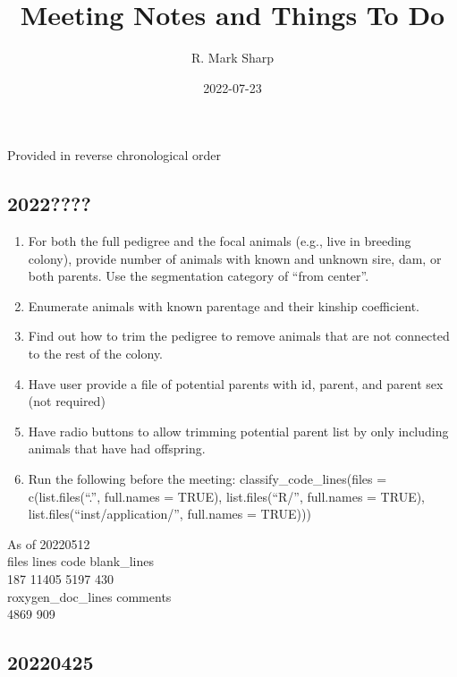 \documentclass[
]{article}
\title{Meeting Notes and Things To Do}
\author{R. Mark Sharp}
\date{2022-07-23}
\begin{document}
\maketitle

Provided in reverse chronological order

\hypertarget{section}{%
\subsection{2022????}\label{section}}

\begin{enumerate}
\def\labelenumi{\arabic{enumi}.}
\item
  For both the full pedigree and the focal animals (e.g., live in
  breeding colony), provide number of animals with known and unknown
  sire, dam, or both parents. Use the segmentation category of ``from
  center''.
\item
  Enumerate animals with known parentage and their kinship coefficient.
\item
  Find out how to trim the pedigree to remove animals that are not
  connected to the rest of the colony.
\item
  Have user provide a file of potential parents with id, parent, and
  parent sex (not required)
\item
  Have radio buttons to allow trimming potential parent list by only
  including animals that have had offspring.
\item
  Run the following before the meeting: classify\_code\_lines(files =
  c(list.files(``.'', full.names = TRUE), list.files(``R/'', full.names
  = TRUE), list.files(``inst/application/'', full.names = TRUE)))
\end{enumerate}

As of 20220512\\
files lines code blank\_lines\\
187 11405 5197 430\\
roxygen\_doc\_lines comments\\
4869 909

\hypertarget{section-1}{%
\subsection{20220425}\label{section-1}}
\end{document}
